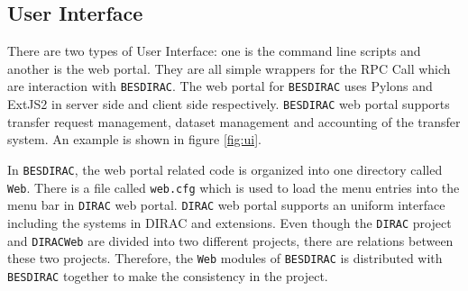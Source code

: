 \subsection{User Interface}
There are two types of User Interface: one is the command line scripts and 
another is the web portal. 
They are all simple wrappers for the RPC Call which are interaction
with {\tt BESDIRAC}.
The web portal for {\tt BESDIRAC} uses Pylons and ExtJS2 in server side and
client side respectively\cite{bib:webportal}. {\tt BESDIRAC} web portal supports
transfer request management, dataset management and  
accounting of the transfer system. An example is shown in figure
\ref{fig:ui}.

In {\tt BESDIRAC}, the web portal related code is organized into one
directory called {\tt Web}. There is a file called \verb"web.cfg"
which is used to load the menu entries into the menu bar in {\tt DIRAC} 
web portal. {\tt DIRAC} web portal supports an uniform interface including
the systems in DIRAC and extensions.
Even though the {\tt DIRAC} project and {\tt DIRACWeb} are divided into
two different projects, there are relations between these two projects. 
Therefore, the {\tt Web} modules of {\tt BESDIRAC} is distributed 
with {\tt BESDIRAC} together to make the consistency in the project. 


